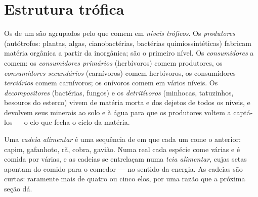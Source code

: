 \section{Estrutura trófica}

\begin{definition}\label{def:b1:ecosystem-organization:trophic}
Os  de um  são agrupados pelo que comem em
\emph{níveis tróficos}. Os \emph{produtores} (autótrofos: plantas,
algas, cianobactérias, bactérias quimiossintéticas) fabricam matéria
orgânica a partir da inorgânica; são o primeiro nível. Os
\emph{consumidores} a comem: os \emph{consumidores primários}
(herbívoros) comem produtores, os \emph{consumidores secundários}
(carnívoros) comem herbívoros, os consumidores \emph{terciários} comem
carnívoros; os onívoros comem em vários níveis. Os
\emph{decompositores} (bactérias, fungos) e os \emph{detritívoros}
(minhocas, tatuzinhos, besouros do esterco) vivem de matéria morta e
dos dejetos de todos os níveis, e devolvem seus minerais ao solo e à
água para que os produtores voltem a captá-los --- o elo que fecha o
ciclo da matéria.
\end{definition}

\begin{definition}\label{def:b1:ecosystem-organization:foodweb}
Uma \emph{cadeia alimentar} é uma sequência de  em que cada
um come o anterior: capim, gafanhoto, rã, cobra, gavião. Numa
 real cada espécie come várias e é comida por várias, e as
cadeias se entrelaçam numa \emph{teia alimentar}, cujas setas apontam
do comido para o comedor --- no sentido da energia. As cadeias são
curtas: raramente mais de quatro ou cinco elos, por uma razão que a
próxima seção dá.
\end{definition}

